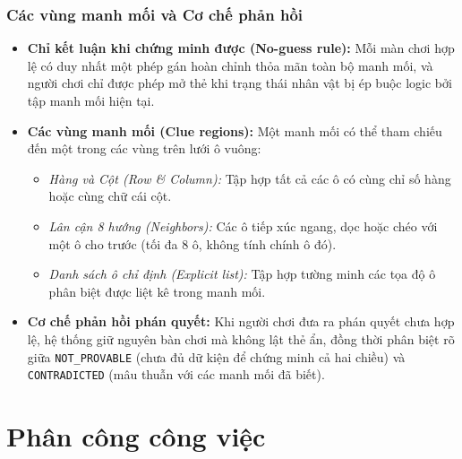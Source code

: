 \documentclass[12pt,a4paper]{article}
\begin{document}
    \subsubsection{Các vùng manh mối và Cơ chế phản hồi}
    \begin{itemize}
        \item \textbf{Chỉ kết luận khi chứng minh được (No-guess rule):} Mỗi màn chơi hợp lệ có duy nhất một phép gán hoàn chỉnh thỏa mãn toàn bộ manh mối, và người chơi chỉ được phép mở thẻ khi trạng thái nhân vật bị ép buộc logic bởi tập manh mối hiện tại.

        \item \textbf{Các vùng manh mối (Clue regions):} Một manh mối có thể tham chiếu đến một trong các vùng trên lưới ô vuông:
        \begin{itemize}
            \item \emph{Hàng và Cột (Row \& Column):} Tập hợp tất cả các ô có cùng chỉ số hàng hoặc cùng chữ cái cột.
            \item \emph{Lân cận 8 hướng (Neighbors):} Các ô tiếp xúc ngang, dọc hoặc chéo với một ô cho trước (tối đa 8 ô, không tính chính ô đó).
            \item \emph{Danh sách ô chỉ định (Explicit list):} Tập hợp tường minh các tọa độ ô phân biệt được liệt kê trong manh mối.
        \end{itemize}

        \item \textbf{Cơ chế phản hồi phán quyết:} Khi người chơi đưa ra phán quyết chưa hợp lệ, hệ thống giữ nguyên bàn chơi mà không lật thẻ ẩn, đồng thời phân biệt rõ giữa \texttt{NOT\_PROVABLE} (chưa đủ dữ kiện để chứng minh cả hai chiều) và \texttt{CONTRADICTED} (mâu thuẫn với các manh mối đã biết).
    \end{itemize}
    \section{Phân công công việc}
\end{document}
